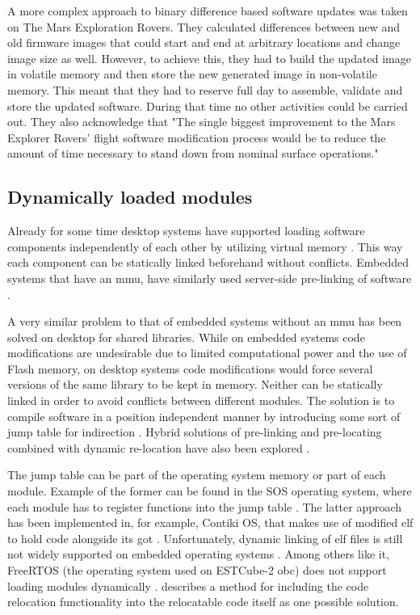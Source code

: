 A more complex approach to binary difference based software updates was taken on The Mars Exploration Rovers. They calculated differences between new and old firmware images that could start and end at arbitrary locations and change image size as well. However, to achieve this, they had to build the updated image in volatile memory and then store the new generated image in non-volatile memory. This meant that they had to reserve full day to assemble, validate and store the updated software. During that time no other activities could be carried out. They also acknowledge that "The single biggest improvement to the Mars Explorer Rovers' flight software modification process would be to reduce the amount of time necessary to stand down from nominal surface operations." \cite{Greco2005}

\subsection{Dynamically loaded modules}

Already for some time desktop systems have supported loading software components independently of each other by utilizing virtual memory \cite{Kilburn1962}. This way each component can be statically linked beforehand without conflicts. Embedded systems that have an \gls{mmu}, have similarly used server-side pre-linking of software \cite{Shen2010}.

A very similar problem to that of embedded systems without an \gls{mmu} has been solved on desktop for shared libraries. While on embedded systems code modifications are undesirable due to limited computational power and the use of Flash memory, on desktop systems code modifications would force several versions of the same library to be kept in memory. Neither can be statically linked in order to avoid conflicts between different modules. The solution is to compile software in a position independent manner by introducing some sort of jump table for indirection \cite[Chapter~8]{Levine1999}. Hybrid solutions of pre-linking and pre-locating combined with dynamic re-location have also been explored \cite{Dong2009}. 

The jump table can be part of the operating system memory or part of each module. Example of the former can be found in the SOS operating system, where each module has to register functions into the jump table \cite{Han2005}. The latter approach has been implemented in, for example, Contiki OS, that makes use of modified \gls{elf} to hold code alongside its \gls{got} \cite{Dunkels2006}. Unfortunately, dynamic linking of \gls{elf} files is still not widely supported on embedded operating systems \cite{Xinyu2017}. Among others like it, FreeRTOS (the operating system used on ESTCube-2 \gls{obc}) does not support loading modules dynamically \cite{Barry2005}. \textcite{Xinyu2017} describes a method for including the code relocation functionality into the relocatable code itself as one possible solution.


